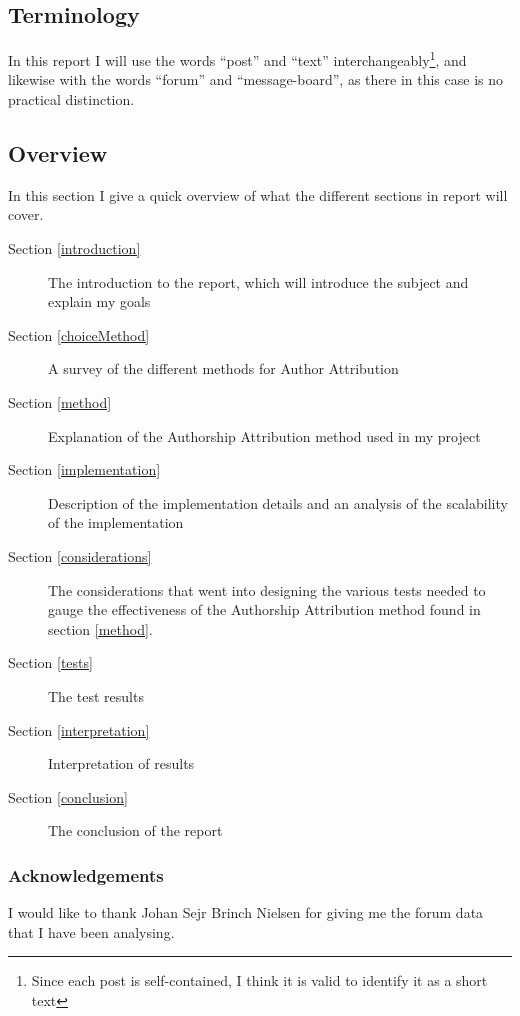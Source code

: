 \subsection{Terminology}
In this report I will use the words ``post'' and ``text'' interchangeably\footnote{Since each post is self-contained, I think it is valid to identify it as a short text}, and likewise with the words ``forum'' and ``message-board'', as there in this case is no practical distinction.

\subsection{Overview}
In this section I give a quick overview of what the different sections in report will cover.
\begin{description}
\item[Section \ref{introduction}] The introduction to the report, which will introduce the subject and explain my goals
\item[Section \ref{choiceMethod}] A survey of the different methods for Author Attribution  
\item[Section \ref{method}] Explanation of the Authorship Attribution method used in my project
\item[Section \ref{implementation}] Description of the implementation details and an analysis of the scalability of the implementation
\item[Section \ref{considerations}] The considerations that went into designing the various tests needed to gauge the effectiveness of the Authorship Attribution method found in section \ref{method}.
\item[Section \ref{tests}] The test results
\item[Section \ref{interpretation}] Interpretation of results
\item[Section \ref{conclusion}] The conclusion of the report  
\end{description}

\subsubsection*{Acknowledgements}
I would like to thank Johan Sejr Brinch Nielsen for giving me the forum data that I have been analysing.
